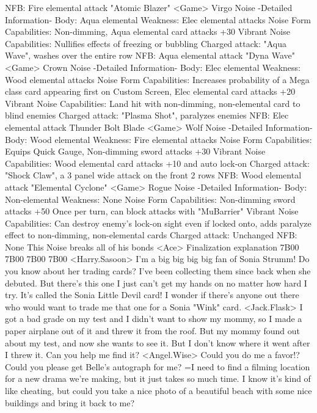 NFB: Fire elemental attack "Atomic Blazer" 
<Game> Virgo Noise -Detailed Information- 
Body: Aqua elemental Weakness: Elec elemental attacks 
Noise Form Capabilities: Non-dimming, Aqua elemental card attacks +30 
Vibrant Noise Capabilities: Nullifies effects of freezing or bubbling 
Charged attack: "Aqua Wave", washes 
over the entire row NFB: Aqua elemental attack "Dyna Wave" 
<Game> Crown Noise -Detailed Information- 
Body: Elec elemental Weakness: Wood elemental attacks 
Noise Form Capabilities: Increases probability of a Mega class card appearing 
first on Custom Screen, Elec elemental card attacks +20 
Vibrant Noise Capabilities: Land hit with non-dimming, 
non-elemental card to blind enemies 
Charged attack: "Plasma Shot", paralyzes enemies 
NFB: Elec elemental attack Thunder Bolt Blade 
<Game> Wolf Noise -Detailed Information- 
Body: Wood elemental Weakness: Fire elemental attacks 
Noise Form Capabilities: Equips Quick Gauge, 
Non-dimming sword attacks +30 
Vibrant Noise Capabilities: Wood elemental card attacks +10 and auto lock-on 
Charged attack: "Shock Claw", a 3 panel wide attack on the front 2 rows 
NFB: Wood elemental attack "Elemental Cyclone" 
<Game> Rogue Noise -Detailed Information- 
Body: Non-elemental Weakness: None 
Noise Form Capabilities: Non-dimming sword attacks +50 
Once per turn, can block attacks with "MuBarrier" 
Vibrant Noise Capabilities: Can destroy enemy's lock-on sight even if locked onto, 
adds paralyze effect to non-dimming, non-elemental cards 
Charged attack: Unchanged 
NFB: None This Noise breaks all of his bonds 
<Ace> Finalization explanation 
{7B}{00} 
{7B}{00} 
{7B}{00} 
{7B}{00} 
<Harry.Sasoon> I'm a big big big big fan of Sonia Strumm! 
Do you know about her trading cards? 
I've been collecting them since back when she debuted. 
But there's this one I just can't get my hands on no matter how hard I try. 
It's called the Sonia Little Devil card! 
I wonder if there's anyone out there who would want 
to trade me that one for a Sonia "Wink" card. 
<Jack.Flask> I got a bad grade on my test and I didn't want to show my mommy, 
so I made a paper airplane out of it and threw it from the roof. 
But my mommy found out about my test, and now she wants to see it. 
But I don't know where it went after I threw it. Can you help me find it? 
<Angel.Wise> Could you do me a favor!? 
Could you please get Belle's autograph for me? 
=I need to find a filming location for a new drama 
we're making, but it just takes so much time. 
I know it's kind of like cheating, but could you take a nice photo of a 
beautiful beach with some nice buildings and bring it back to me? 

